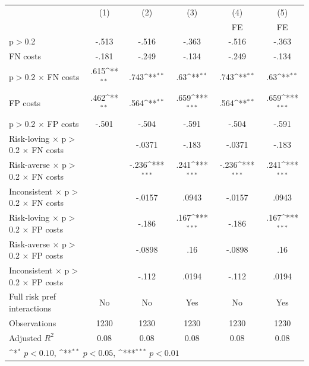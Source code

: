 {
\def\sym#1{\ifmmode^{#1}\else\(^{#1}\)\fi}
\begin{tabular}{l*{5}{c}}
\hline\hline
                &\multicolumn{1}{c}{(1)}&\multicolumn{1}{c}{(2)}&\multicolumn{1}{c}{(3)}&\multicolumn{1}{c}{(4)}&\multicolumn{1}{c}{(5)}\\
                &\multicolumn{1}{c}{}&\multicolumn{1}{c}{}&\multicolumn{1}{c}{}&\multicolumn{1}{c}{FE}&\multicolumn{1}{c}{FE}\\
\hline
p$>$0.2         &    -.513         &    -.516         &    -.363         &    -.516         &    -.363         \\
FN costs        &    -.181         &    -.249         &    -.134         &    -.249         &    -.134         \\
p$>$0.2 $\times$ FN costs&     .615\sym{**} &     .743\sym{**} &      .63\sym{**} &     .743\sym{**} &      .63\sym{**} \\
FP costs        &     .462\sym{**} &     .564\sym{**} &     .659\sym{***}&     .564\sym{**} &     .659\sym{***}\\
p$>$0.2 $\times$ FP costs&    -.501         &    -.504         &    -.591         &    -.504         &    -.591         \\
Risk-loving $\times$ p$>$0.2 $\times$ FN costs&                  &   -.0371         &    -.183         &   -.0371         &    -.183         \\
Risk-averse $\times$ p$>$0.2 $\times$ FN costs&                  &    -.236\sym{***}&     .241\sym{***}&    -.236\sym{***}&     .241\sym{***}\\
Inconsistent $\times$ p$>$0.2 $\times$ FN costs&                  &   -.0157         &    .0943         &   -.0157         &    .0943         \\
Risk-loving $\times$ p$>$0.2 $\times$ FP costs&                  &    -.186         &     .167\sym{***}&    -.186         &     .167\sym{***}\\
Risk-averse $\times$ p$>$0.2 $\times$ FP costs&                  &   -.0898         &      .16         &   -.0898         &      .16         \\
Inconsistent $\times$ p$>$0.2 $\times$ FP costs&                  &    -.112         &    .0194         &    -.112         &    .0194         \\
Full risk pref interactions&       No         &       No         &      Yes         &       No         &      Yes         \\
\hline
Observations    &     1230         &     1230         &     1230         &     1230         &     1230         \\
Adjusted \(R^{2}\)&     0.08         &     0.08         &     0.08         &     0.08         &     0.08         \\
\hline\hline
\multicolumn{6}{l}{\footnotesize \sym{*} \(p<0.10\), \sym{**} \(p<0.05\), \sym{***} \(p<0.01\)}\\
\end{tabular}
}
